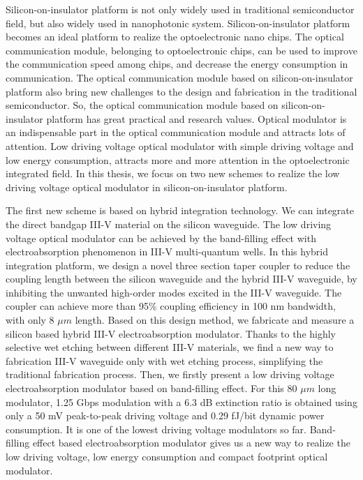 \begin{englishabstract}
Silicon-on-insulator platform is not only widely used in traditional semiconductor field, but also widely used in nanophotonic system. Silicon-on-insulator platform becomes an ideal platform to realize the optoelectronic nano chips. The optical communication module, belonging to optoelectronic chips, can be used to improve the communication speed among chips, and decrease the energy consumption in communication. The optical communication module based on silicon-on-insulator platform also bring new challenges to the design and fabrication in the traditional semiconductor. So, the optical communication module based on silicon-on-insulator platform has great practical and research values. Optical modulator is an indispensable part in the optical communication module and attracts lots of attention. Low driving voltage optical modulator with simple driving voltage and low energy consumption, attracts more and more attention in the optoelectronic integrated field. In this thesis, we focus on two new schemes to realize the low driving voltage optical modulator in silicon-on-insulator platform.

The first new scheme is based on hybrid integration technology. We can integrate the direct bandgap III-V material on the silicon waveguide. The low driving voltage optical modulator can be achieved by the band-filling effect with electroabsorption phenomenon in III-V multi-quantum wells. In this hybrid integration platform, we design a novel three section taper coupler to reduce the coupling length between the silicon waveguide and the hybrid III-V waveguide, by inhibiting the unwanted high-order modes excited in the III-V waveguide. The coupler can achieve more than 95\% coupling efficiency in 100 nm bandwidth, with only 8 $\mu m$ length. Based on this design method, we fabricate and measure a silicon based hybrid III-V electroabsorption modulator. Thanks to the highly selective wet etching between different III-V materials, we find a new way to fabrication III-V waveguide only with wet etching process, simplifying the traditional  fabrication process. Then, we firstly present a low driving voltage electroabsorption modulator based on band-filling effect. For this 80 $\mu m$ long modulator, 1.25 Gbps modulation with a 6.3 dB extinction ratio is obtained using only a 50 mV peak-to-peak driving voltage and 0.29 fJ/bit dynamic power consumption. It is one of the lowest driving voltage modulators so far. Band-filling effect based electroabsorption modulator gives us a new way to realize the low driving voltage, low energy consumption and compact footprint optical modulator.


\end{englishabstract}
